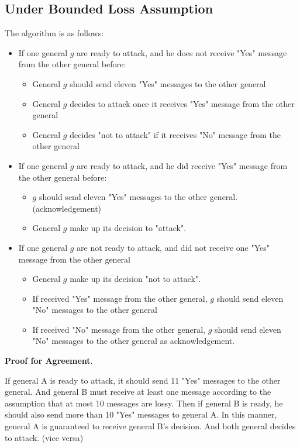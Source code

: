 \documentclass[11pt,a4paper]{article}
\begin{document}
\subsection{Under Bounded Loss Assumption}
The algorithm is as follows: 
\begin{itemize} 
    \item{If one general $g$ are ready to attack, and he does not receive "Yes"
        message from the other general before: }
        \begin{itemize}
            \item{General $g$ should send eleven "Yes" messages to the other general}
            \item{General $g$ decides to attack once it receives "Yes" message
                    from the other general}
            \item{General $g$ decides "not to attack" if it receives "No" message
                    from the other general}
        \end{itemize}
    \item{If one general $g$ are ready to attack, and he did receive "Yes"
        message from the other general before: }
        \begin{itemize}
            \item{$g$ should send eleven "Yes" messages to the other general.
                    (acknowledgement)}
            \item{General $g$ make up its decision to "attack".}
        \end{itemize}
    \item{If one general $g$ are not ready to attack, and did not receive one "Yes"
            message from the other general}
        \begin{itemize}
            \item{General $g$ make up its decision "not to attack".}
            \item{If received "Yes" message from the other general, $g$ should
                    send eleven "No" messages to the other general}
            \item{If received "No" message from the other general, $g$ should
                    send eleven "No" messages to the other general as
                    acknowledgement. }
        \end{itemize}
\end{itemize}

\textbf{Proof for Agreement}. 

If general A is ready to attack, it should send 11 "Yes" messages to
the other general. And general B must receive at least one message
according to the assumption that at most 10 messages are lossy. Then if
general B is ready, he should also send more than 10 "Yes" messages to general A.
In this manner, general A is guaranteed to receive general B's decision. And
both general decides to attack. (vice versa)
\end{document}

